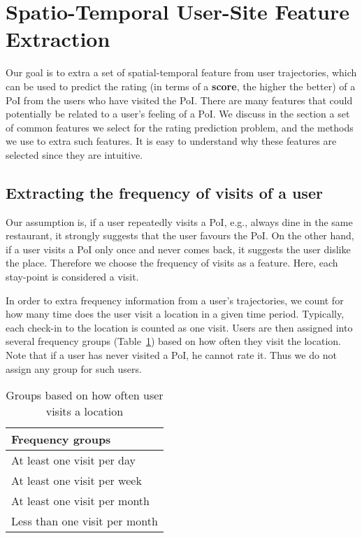 \section{Spatio-Temporal User-Site Feature Extraction}
\label{sec:method}

Our goal is to extra a set of spatial-temporal feature from user trajectories, which can be used to predict the rating (in terms of a \textbf{score}, the higher the better) of a PoI from the users who have visited the PoI. There are many features that could potentially be related to a user's feeling of a PoI. We discuss in the section a set of common features we select for the rating prediction problem, and the methods we use to extra such features. It is easy to understand why these features are selected since they are intuitive.

\subsection{Extracting the frequency of visits of a user}

Our assumption is, if a user repeatedly visits a PoI, e.g., always dine in the same restaurant, it strongly suggests that the user favours the PoI. On the other hand, if a user visits a PoI only once and never comes back, it suggests the user dislike the place. Therefore we choose the frequency of visits as a feature. Here, each stay-point is considered a visit.

In order to extra frequency information from a user's trajectories, we count for how many time does the user visit a location in a given time period. Typically, each check-in to the location is counted as one visit. Users are then assigned into several frequency groups (Table~\ref{frequencyGroups}) based on how often they visit the location. Note that if a user has never visited a PoI, he cannot rate it. Thus we do not assign any group for such users.

\begin{table}[htbp]
\begin{center}
\caption{Groups based on how often user visits a location \label{frequencyGroups}}
\begin{tabular}{|l|} \hline
\textbf{Frequency groups} \\ \hline
At least one visit per day \\ \hline
At least one visit per week \\ \hline
At least one visit per month \\ \hline
Less than one visit per month \\ \hline
\end{tabular}
\end{center}
\end{table}

